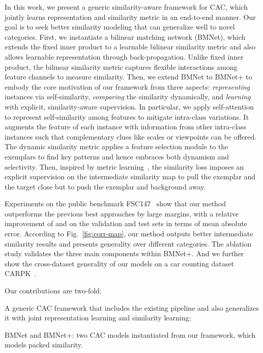 \documentclass[10pt,twocolumn,letterpaper]{article}
\begin{document}
In this work, we present a generic similarity-aware framework for CAC, which jointly learns representation and similarity metric in an end-to-end manner. Our goal is to seek better similarity modeling that can generalize well to novel categories. First, 
we instantiate a bilinear matching network (BMNet), which extends the fixed inner product to a learnable bilinear similarity metric and also allows learnable representation through back-propagation. Unlike fixed inner product, the bilinear similarity metric captures flexible interactions among feature channels to measure similarity. Then, we extend BMNet to BMNet+ to embody the core motivation of our framework from three aspects: 
\textit{representing} instances via self-similarity, \textit{comparing} the similarity dynamically, and \textit{learning} with explicit, similarity-aware supervision. 
In particular, we apply self-attention~\cite{sa_gan} to represent self-similarity among features to mitigate intra-class variations. It augments the feature of each instance with information from other intra-class instances 
such that complementary clues like scales or viewpoints can be offered.
The dynamic similarity metric applies a feature selection module to the exemplars to find key patterns and hence embraces both dynamism and selectivity. Then, inspired by metric learning~\cite{metric_learning_reality_check}, the similarity loss imposes an explicit supervision on the intermediate similarity map to pull the exemplar and the target close but 
to 
push the exemplar and background away. 

Experiments on the public benchmark FSC147~\cite{famnet} show that our method outperforms the previous best approaches by large margins, with a relative improvement of  and  on the validation and test sets in terms of mean absolute error. According to Fig.~\ref{fig:corr-map}, our method outputs better intermediate similarity results and presents generality over different categories. The ablation study validates the three main components within BMNet+. And we further show the cross-dataset generality of our models on a car counting dataset CARPK~\cite{carpk}.

Our contributions are two-fold:

 A generic CAC framework that includes the existing pipeline and also generalizes it with joint representation learning and similarity learning;

 BMNet and BMNet+: two CAC models instantiated from our framework, which models packed similarity.
\end{document}
